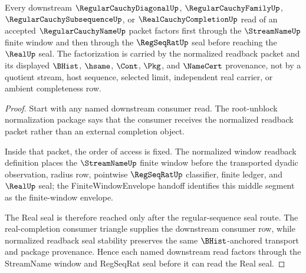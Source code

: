 \begin{theorem}
\label{thm:regularcauchyname-streamname-real-seal-factorization}
Every downstream $\RegularCauchyDiagonalUp$, $\RegularCauchyFamilyUp$, $\RegularCauchySubsequenceUp$, or $\RealCauchyCompletionUp$ read of an accepted $\RegularCauchyNameUp$ packet factors first through the $\StreamNameUp$ finite window and then through the $\RegSeqRatUp$ seal before reaching the $\RealUp$ seal. The factorization is carried by the normalized readback packet and its displayed $\BHist$, $\hsame$, $\Cont$, $\Pkg$, and $\NameCert$ provenance, not by a quotient stream, host sequence, selected limit, independent real carrier, or ambient completeness row.
\end{theorem}
\begin{proof}
Start with any named downstream consumer read. The root-unblock normalization package says that the consumer receives the normalized readback packet rather than an external completion object.

Inside that packet, the order of access is fixed. The normalized window readback definition places the $\StreamNameUp$ finite window before the transported dyadic observation, radius row, pointwise $\RegSeqRatUp$ classifier, finite ledger, and $\RealUp$ seal; the FiniteWindowEnvelope handoff identifies this middle segment as the finite-window envelope.

The Real seal is therefore reached only after the regular-sequence seal route. The real-completion consumer triangle supplies the downstream consumer row, while normalized readback seal stability preserves the same $\BHist$-anchored transport and package provenance. Hence each named downstream read factors through the StreamName window and RegSeqRat seal before it can read the Real seal.
\end{proof}

